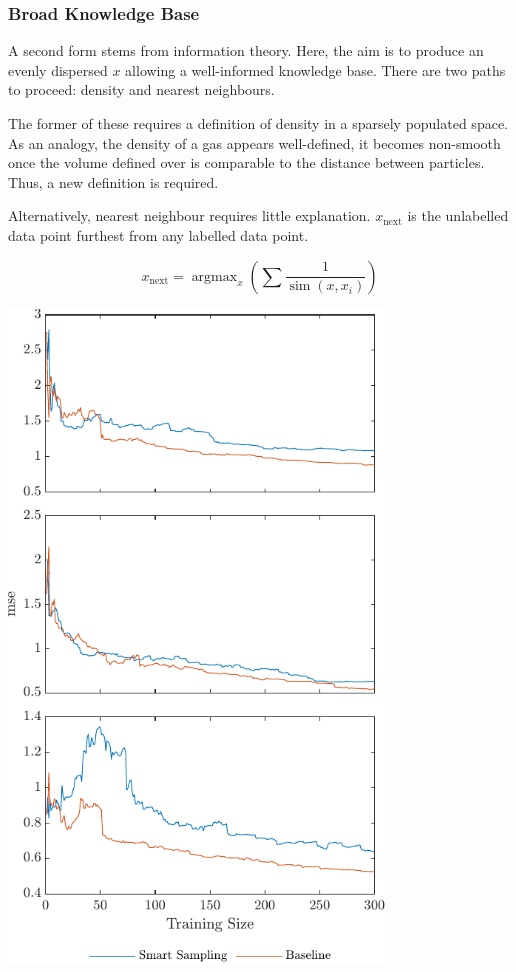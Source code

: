\documentclass[a4paper, english]{report}
\DeclareMathOperator*{\argmax}{argmax}
\DeclareMathOperator*{\simm}{sim}
\begin{document}
\subsubsection{Broad Knowledge Base}
A second form stems from information theory. Here, the aim is to produce an evenly dispersed $x$ allowing a well-informed knowledge base. There are two paths to proceed: density and nearest neighbours.

The former of these requires a definition of density in a sparsely populated space. As an analogy, the density of a gas appears well-defined, it becomes non-smooth once the volume defined over is comparable to the distance between particles. Thus, a new definition is required.

Alternatively, nearest neighbour requires little explanation. $x_\mathrm{next}$ is the unlabelled data point furthest from any labelled data point.

\begin{equation}
    \label{eq:inverseSim}
    x_\mathrm{next}=\argmax_x{\left(\sum{\frac{1}{\simm{(x, x_i)}}}\right)}
\end{equation}

\includegraphics[width=100mm]{BKB_300_all3.pdf}
\end{document}
